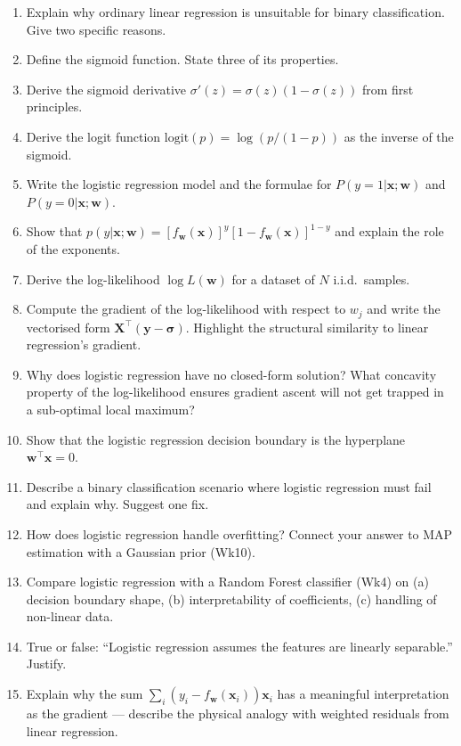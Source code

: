 \documentclass[11pt, a4paper]{article}
\begin{document}
\begin{enumerate}
  \item Explain why ordinary linear regression is unsuitable for binary classification. Give two specific reasons.
  \item Define the sigmoid function. State three of its properties.
  \item Derive the sigmoid derivative $\sigma'(z) = \sigma(z)(1-\sigma(z))$ from first principles.
  \item Derive the logit function $\mathrm{logit}(p) = \log(p/(1-p))$ as the inverse of the sigmoid.
  \item Write the logistic regression model and the formulae for $P(y=1|\mathbf{x};\mathbf{w})$ and $P(y=0|\mathbf{x};\mathbf{w})$.
  \item Show that $p(y|\mathbf{x};\mathbf{w}) = [f_\mathbf{w}(\mathbf{x})]^y[1-f_\mathbf{w}(\mathbf{x})]^{1-y}$ and explain the role of the exponents.
  \item Derive the log-likelihood $\log L(\mathbf{w})$ for a dataset of $N$ i.i.d.\ samples.
  \item Compute the gradient of the log-likelihood with respect to $w_j$ and write the vectorised form $\mathbf{X}^\top(\mathbf{y}-\boldsymbol\sigma)$. Highlight the structural similarity to linear regression's gradient.
  \item Why does logistic regression have no closed-form solution? What concavity property of the log-likelihood ensures gradient ascent will not get trapped in a sub-optimal local maximum?
  \item Show that the logistic regression decision boundary is the hyperplane $\mathbf{w}^\top\mathbf{x} = 0$.
  \item Describe a binary classification scenario where logistic regression must fail and explain why. Suggest one fix.
  \item How does logistic regression handle overfitting? Connect your answer to MAP estimation with a Gaussian prior (Wk10).
  \item Compare logistic regression with a Random Forest classifier (Wk4) on (a) decision boundary shape, (b) interpretability of coefficients, (c) handling of non-linear data.
  \item True or false: ``Logistic regression assumes the features are linearly separable.'' Justify.
  \item Explain why the sum $\sum_i (y_i - f_\mathbf{w}(\mathbf{x}_i))\mathbf{x}_i$ has a meaningful interpretation as the gradient — describe the physical analogy with weighted residuals from linear regression.
\end{enumerate}
\end{document}
